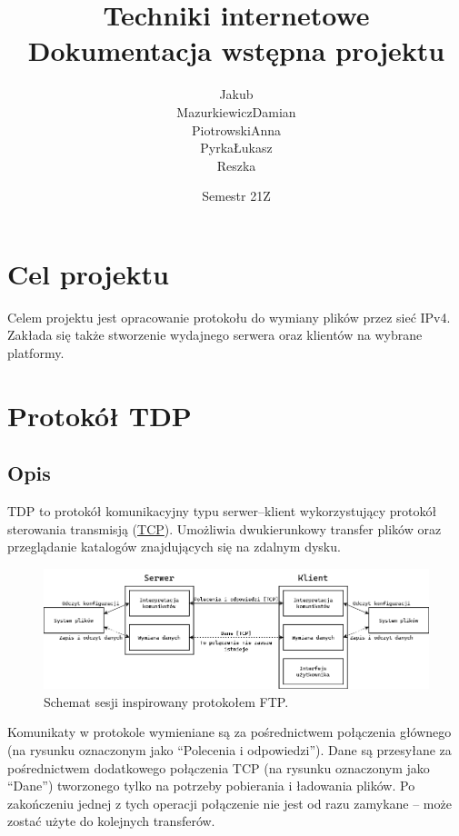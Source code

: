 \documentclass[10pt,a4paper]{article}
\title{Techniki internetowe \\ \large Dokumentacja wstępna projektu \quotes{TinDox}}
\author{
    \begin{tabular}{p{6em}p{6em}p{6em}p{6em}}
        \makecell{Jakub \\ Mazurkiewicz} &
        \makecell{Damian \\ Piotrowski} &
        \makecell{Anna \\ Pyrka} &
        \makecell{Łukasz \\ Reszka}
    \end{tabular}
}
\date{Semestr 21Z}
\newcommand{\quotes}[1]{``#1''}
\begin{document}
\maketitle
\tableofcontents
\pagebreak

\section{Cel projektu}
Celem projektu jest opracowanie protokołu do wymiany plików przez sieć IPv4. Zakłada się także stworzenie wydajnego serwera oraz klientów na wybrane platformy.

\section{Protokół TDP}

\subsection{Opis}
TDP to protokół komunikacyjny typu serwer--klient wykorzystujący protokół sterowania transmisją (\href{https://en.wikipedia.org/wiki/Transmission_Control_Protocol}{TCP}). Umożliwia dwukierunkowy transfer plików oraz przeglądanie katalogów znajdujących się na zdalnym dysku.

\begin{figure}[ht]
\centering
\includegraphics[width=1.001\textwidth]{img/session.png}
\caption{\label{fig:session.png}Schemat sesji inspirowany protokołem FTP.}
\end{figure}
\FloatBarrier

Komunikaty w protokole wymieniane są za pośrednictwem połączenia głównego (na rysunku oznaczonym jako \quotes{Polecenia i odpowiedzi}). Dane są przesyłane za pośrednictwem dodatkowego połączenia TCP (na rysunku oznaczonym jako \quotes{Dane}) tworzonego tylko na potrzeby pobierania i ładowania plików. Po zakończeniu jednej z tych operacji połączenie nie jest od razu zamykane -- może zostać użyte do kolejnych transferów.
\end{document}
